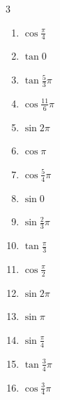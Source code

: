 \begin{multicols}{3}
\begin{enumerate}
  \item $\displaystyle \cos{\frac{\pi}{4}}$

  \item $\displaystyle \tan{0}$
        \phantom{$\displaystyle =0$}

  \item $\displaystyle \tan{\frac{5}{3}\pi}$

  \item $\displaystyle \cos{\frac{11}{6}\pi}$

  \item $\displaystyle \sin{2\pi}$
        \phantom{$\displaystyle =0$}

  \item $\displaystyle \cos{\pi}$
        \phantom{$\displaystyle =-1$}

  \item $\displaystyle \cos{\frac{5}{4}\pi}$

\columnbreak %

  \item $\displaystyle \sin{0}$
        \phantom{$\displaystyle =0$}

  \item $\displaystyle \sin{\frac{2}{3}\pi}$

  \item $\displaystyle \tan{\frac{\pi}{3}}$

  \item $\displaystyle \cos{\frac{\pi}{2}}$
        \phantom{$\displaystyle =0$}

  \item $\displaystyle \sin{2\pi}$
        \phantom{$\displaystyle =0$}

  \item $\displaystyle \sin{\pi}$
        \phantom{$\displaystyle =0$}

  \item $\displaystyle \sin{\frac{\pi}{4}}$

  \item $\displaystyle \tan{\frac{3}{4}\pi}$
        \phantom{$\displaystyle =-1$}

  \item $\displaystyle \cos{\frac{3}{4}\pi}$


\end{enumerate}
\end{multicols}
